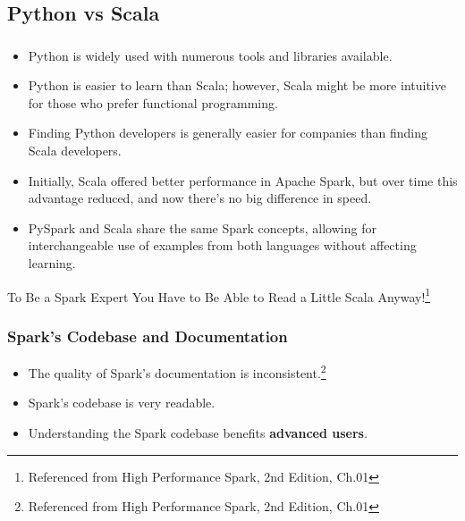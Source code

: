 

\subsection{Python vs Scala}\label{subsec:python-vs-scala}
\begin{frame}
    \frametitle{\subsecname}
    \begin{itemize}
        \item Python is widely used with numerous tools and libraries available.
        \item Python is easier to learn than Scala; however, Scala might be more intuitive for those who prefer functional programming.
        \item Finding Python developers is generally easier for companies than finding Scala developers.
        \item Initially, Scala offered better performance in Apache Spark, but over time this advantage reduced, and now there's no big difference in speed.
        \item PySpark and Scala share the same Spark concepts, allowing for interchangeable use of examples from both languages without affecting learning.
    \end{itemize}
\end{frame}

\begin{frame}
    \begin{center}
        \begin{tcolorbox}[colback=blue!5!white,colframe=blue!75!black,title=Attention!]
            To Be a Spark Expert You Have to Be Able to Read a Little Scala Anyway!\footnote{Referenced from High Performance Spark, 2nd Edition, Ch.01}
        \end{tcolorbox}
    \end{center}

\end{frame}

%
\begin{frame}
    \frametitle{Spark's Codebase and Documentation}
    \begin{itemize}
        \item The quality of Spark's documentation is inconsistent.\footnote{Referenced from High Performance Spark, 2nd Edition, Ch.01}
        \item Spark's codebase is very readable.
        \item Understanding the Spark codebase benefits \textbf{advanced users}.
    \end{itemize}

\end{frame}

